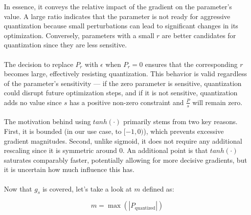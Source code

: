 \noindent In essence, it conveys the relative impact of the gradient on the parameter's value.
A large ratio indicates that the parameter is not ready for aggressive quantization
because small perturbations can lead to significant changes in its optimization.
Conversely, parameters with a small \(  r  \) are better candidates
for quantization since they are less sensitive.
\\
\\
The decision to replace \( P_r \) with \( \epsilon \) when \( P_r = 0 \)
ensures that the corresponding \( r \) becomes large,
effectively resisting quantization. This behavior is valid regardless of the parameter's sensitivity
 — if the zero parameter is sensitive, quantization could disrupt future optimization steps,
 and if it is not sensitive, quantization adds no value since \( s \) has a positive non-zero constraint 
 and \( \frac{P}{s} \) will remain zero.
\\
\\
The motivation behind using \( tanh(\cdot) \) primarily stems from two key reasons. 
First, it is bounded (in our use case, to \( [-1, 0) \)), which prevents excessive gradient magnitudes.
Second, unlike sigmoid, it does not require any additional rescaling since it is
symmetric around \( 0 \). An additional point is that \( tanh(\cdot) \) saturates comparably faster,
potentially allowing for more decisive gradients,
but it is uncertain how much influence this has.
\\
\\
Now that \( g_s \) is covered, let's take a look at \( m \) defined as:

\[
m = \max\left(\left| P_{\text{quantized}} \right|\right) 
\]

